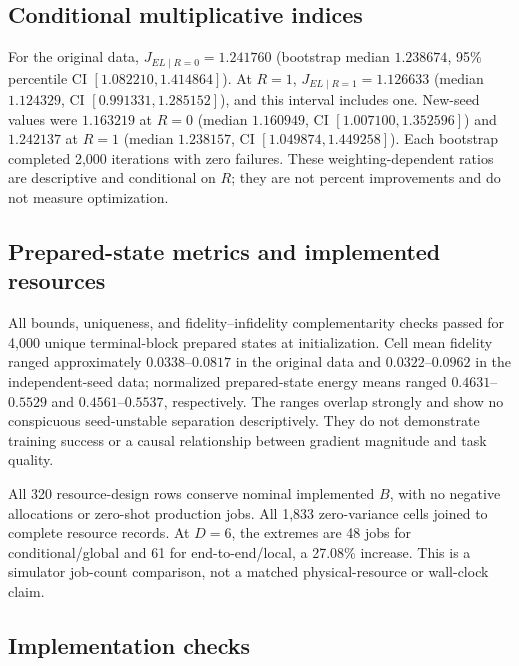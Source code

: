 \documentclass[pdflatex,sn-basic,Numbered]{sn-jnl}
\begin{document}
\subsection{Conditional multiplicative indices}

For the original data, $J_{EL\mid R=0}=1.241760$ (bootstrap median $1.238674$, 95\% percentile CI $[1.082210,1.414864]$). At $R=1$, $J_{EL\mid R=1}=1.126633$ (median $1.124329$, CI $[0.991331,1.285152]$), and this interval includes one. New-seed values were $1.163219$ at $R=0$ (median $1.160949$, CI $[1.007100,1.352596]$) and $1.242137$ at $R=1$ (median $1.238157$, CI $[1.049874,1.449258]$). Each bootstrap completed 2,000 iterations with zero failures. These weighting-dependent ratios are descriptive and conditional on $R$; they are not percent improvements and do not measure optimization.

\subsection{Prepared-state metrics and implemented resources}

All bounds, uniqueness, and fidelity--infidelity complementarity checks passed for 4,000 unique terminal-block prepared states at initialization. Cell mean fidelity ranged approximately $0.0338$--$0.0817$ in the original data and $0.0322$--$0.0962$ in the independent-seed data; normalized prepared-state energy means ranged $0.4631$--$0.5529$ and $0.4561$--$0.5537$, respectively. The ranges overlap strongly and show no conspicuous seed-unstable separation descriptively. They do not demonstrate training success or a causal relationship between gradient magnitude and task quality.

All 320 resource-design rows conserve nominal implemented $B$, with no negative allocations or zero-shot production jobs. All 1,833 zero-variance cells joined to complete resource records. At $D=6$, the extremes are 48 jobs for conditional/global and 61 for end-to-end/local, a 27.08\% increase. This is a simulator job-count comparison, not a matched physical-resource or wall-clock claim.

\subsection{Implementation checks}\label{sec:results-robustness}
\end{document}
